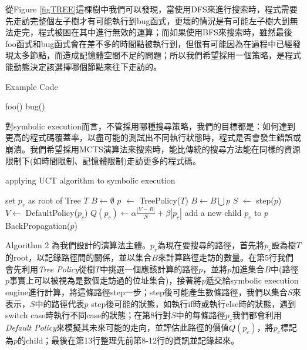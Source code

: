\documentclass[12pt,a4paper,oneside]{book}
\begin{document}
從Figure \ref{figTREE}這棵樹中我們可以發現，當使用DFS來進行搜索時，程式需要先走訪完整個左子樹才有可能執行到bug函式，更壞的情況是有可能左子樹大到無法走完，程式被困在其中進行無效的運算；而如果使用BFS來搜索時，雖然最後foo函式和bug函式會在差不多的時間點被執行到，但很有可能因為在過程中已經發現太多節點，而造成記憶體空間不足的問題；所以我們希望採用一個策略，是程式能動態決定該選擇哪個節點來往下走訪的。

\newpage

\begin{algorithm}[htbp]
  \caption{Example Code}
  \begin{algorithmic}[1]
                	\State foo()
                \EndIf
            \EndIf
        \EndIf
    \Else
                	\State bug()
                \EndIf
            \EndIf
        \EndIf
    \EndIf
  \end{algorithmic}
\end{algorithm}

對symbolic execution而言，不管採用哪種搜尋策略，我們的目標都是：如何達到更高的程式碼覆蓋率，以盡可能的測試出不同執行狀態時，程式是否會發生錯誤或崩潰。我們希望採用MCTS演算法來搜索時，能比傳統的搜尋方法能在同樣的資源限制下(如時間限制、記憶體限制)走訪更多的程式碼。

\begin{algorithm}[htbp]
  \caption{applying UCT algorithm to symbolic execution}
  \begin{algorithmic}[1]
    \State set $p_r$ as root of Tree $T$
    \State $B \leftarrow \emptyset$
      \State $p$ $\leftarrow$ TreePolicy($T$)
      \State $B \leftarrow B \bigcup p$
      \State $S$ $\leftarrow$ step($p$)
      	\State $V \leftarrow$ DefaultPolicy($p_c$)
        \State $Q(p_c) \leftarrow \alpha \frac{|V-B|}{N} + \beta|p_c|$
        \State add a new child $p_c$ to $p$
      \EndFor
      \State BackPropagation($p$)
    \EndWhile
    \EndFunction
  \end{algorithmic}
\end{algorithm}

Algorithm 2 為我們設計的演算法主體。$p_r$為現在要搜尋的路徑，首先將$p_r$設為樹$T$的root，以記錄路徑間的關係，並以集合$B$來計算路徑走訪的數量。在第5行我們會先利用\textit{Tree Policy}從樹$T$中挑選一個應該計算的路徑$p$，並將$p$加進集合$B$中(路徑$p$事實上可以被視為是數個走訪過的位址集合)，接著將$p$遞交給symbolic execution engine進行計算，將這條路徑step一步；step後可能產生數條路徑，我們以集合$S$來表示，$S$中的路徑代表$p$ step後可能的狀態，如執行if時或執行else時的狀態，遇到switch case時執行不同case的狀態；在第8行對$S$中的每條路徑$p_c$我們都會利用\textit{Default Policy}來模擬其未來可能的走向，並評估此路徑的價值$Q(p_c)$，將$p_c$標記為$p$的child；最後在第13行整理先前第8-12行的資訊並記錄起來。
\end{document}
